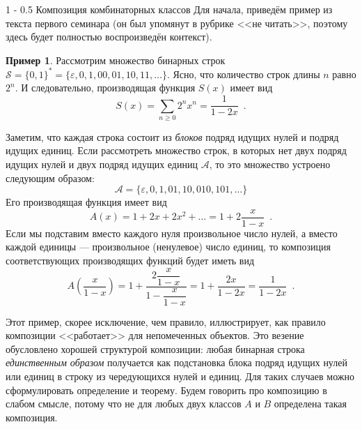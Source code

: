 \documentclass[a5paper]{article}
\makeatletter
\theoremstyle{definition}
\newtheorem{example}{Пример}
\renewcommand{\subsection}{\@startsection
{subsection}%
{1}%
{\z@}%
{-\baselineskip}%
{0.5\baselineskip}%
{\centering\large\scshape}} %
\makeatother
\begin{document}
\subsection{Композиция комбинаторных классов}
Для начала, приведём пример из текста первого семинара (он был упомянут в
рубрике <<не читать>>, поэтому здесь будет полностью воспроизведён контекст).

\begin{example}
	Рассмотрим множество бинарных строк \( \mathcal S = \{0, 1\}^{\ast} = \{ 
	\varepsilon, 0, 1, 00, 01, 10, 11, \ldots \} \).  Ясно, что количество строк 
	длины \( n \) равно \( 2^n \). И следовательно, производящая функция \( 
	S(x) \) имеет вид
	\[
		S(x) = \sum_{n \geq 0} 2^n x^n = \dfrac{1}{1 - 2x}	 \enspace .
	\]

	Заметим, что каждая строка 
	состоит из \textit{блоков} подряд идущих нулей и подряд идущих единиц. Если 
	рассмотреть множество строк, в которых нет двух подряд идущих нулей и двух 
	подряд идущих единиц \( \mathcal A \), то это множество устроено следующим 
	образом:
	\[
		\mathcal A = \{ \varepsilon, 0, 1, 01, 10, 010, 101, \ldots \}
	\]
	Его производящая функция имеет вид
	\[
		A(x) = 1 + 2x + 2x^2 + \ldots = 1 + 2\dfrac{x}{1 - x} \enspace .
	\]
	Если мы подставим вместо каждого нуля произвольное число нулей, а вместо 
	каждой единицы --- произвольное (ненулевое) число единиц, то композиция 
	соответствующих производящих функций будет иметь вид
	\[
		A\left( \dfrac{x}{1 - x}\right) = 1 + \dfrac{2\dfrac{x}{1- x}}{1 - 
		\dfrac{x}{1 - x}} = 1 + \dfrac{2x}{1 - 2x} = \dfrac{1}{1 - 2x} \enspace 
		.
	\]
\end{example}
Этот пример, скорее исключение, чем правило, иллюстрирует, как правило
композиции <<работает>> для непомеченных объектов. Это везение обусловлено
хорошей структурой композиции: любая бинарная строка \textit{единственным
образом} получается как подстановка блока подряд идущих нулей или единиц в
строку из чередующихся нулей и единиц. Для таких случаев можно сформулировать
определение и теорему. Будем говорить про композицию в слабом смысле, потому что
не для любых двух классов \( A \) и \( B \) определена такая композиция.
\end{document}
